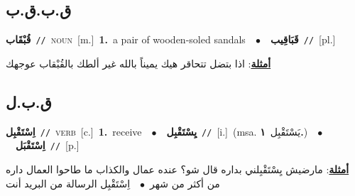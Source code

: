 \documentclass[10pt,a4paper,twoside]{article} %
\begin{document}
\begin{multicols}{2}
{{{{{{{{\vspace{-3mm}
\subsection*{\color{blue}\foreignlanguage{arabic}{ق.ب.ق.ب}\color{blue}{}} 

{\setlength\topsep{0pt}\textbf{\foreignlanguage{arabic}{قُبْقَاب}}\ {\color{gray}\texttt{//}\color{black}}\ \textsc{noun}\ [m.]\ \textbf{1.}~a pair of wooden-soled sandals\ \ $\bullet$\ \ \setlength\topsep{0pt}\textbf{\foreignlanguage{arabic}{قَبَاقِيب}}\ {\color{gray}\texttt{//}\color{black}}\ [pl.]\  \begin{flushright}\color{gray}\foreignlanguage{arabic}{\textbf{\underline{\foreignlanguage{arabic}{أمثلة}}}: اذا بتضل تتحاقر هيك يميناً بالله غير ألطك بالقُبْقاب عوجهك}\end{flushright}\color{black}} \vspace{2mm}

\vspace{-3mm}
\subsection*{\color{blue}\foreignlanguage{arabic}{ق.ب.ل}\color{blue}{}} 

{\setlength\topsep{0pt}\textbf{\foreignlanguage{arabic}{اِسْتَقْبِل}}\ {\color{gray}\texttt{//}\color{black}}\ \textsc{verb}\ [c.]\ \textbf{1.}~receive\ \ $\bullet$\ \ \setlength\topsep{0pt}\textbf{\foreignlanguage{arabic}{يِسْتَقْبِل}}\ {\color{gray}\texttt{//}\color{black}}\ [i.]\ \color{gray}(msa. \foreignlanguage{arabic}{يَسْتَقْبِل}~\foreignlanguage{arabic}{\textbf{١.}})\color{black}\ \ $\bullet$\ \ \setlength\topsep{0pt}\textbf{\foreignlanguage{arabic}{اِسْتَقْبَل}}\ {\color{gray}\texttt{//}\color{black}}\ [p.]\  \begin{flushright}\color{gray}\foreignlanguage{arabic}{\textbf{\underline{\foreignlanguage{arabic}{أمثلة}}}: مارضيش يِسْتَقْبِلني بداره قال شو؟ عنده عمال والكذاب ما طاحوا العمال داره من أكثر من شهر\ $\bullet$\ \  اِسْتَقْبِل الرسالة من البريد أنت}\end{flushright}\color{black}} \vspace{2mm}

}}}}}}}}
\end{multicols}
\end{document}
